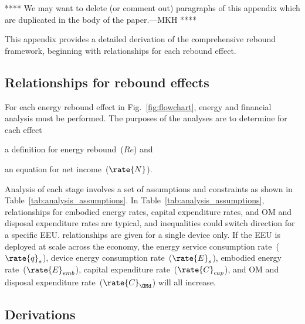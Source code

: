 

**** 
We may want to delete (or comment out)
paragraphs of this appendix which are duplicated
in the body of the paper.---MKH
****

This appendix provides a detailed derivation of the comprehensive rebound framework,
beginning with relationships for each rebound effect.


\subsection{Relationships for rebound effects}
\label{sec:relationships_for_stages}

For each energy rebound effect in Fig.~\ref{fig:flowchart},
energy and financial analysis must be performed.
The purposes of the analyses are to determine for each effect
%
\begin{enumerate*}[label={(\alph*)}]

  \item a definition for energy rebound~($Re$) and

  \item an equation for net income~($\rate{N}$).

\end{enumerate*}

Analysis of each stage involves a set of assumptions and constraints
as shown in Table~\ref{tab:analysis_assumptions}.
In Table~\ref{tab:analysis_assumptions}, 
relationships for \lceffect{} 
embodied energy rates, 
capital expenditure rates, and 
OM and disposal expenditure rates
are typical, and
inequalities could switch direction for a specific EEU.
\Prodeffect{} relationships are given for a single device only.
If the EEU is deployed at scale across the economy, 
the energy service consumption rate~($\rate{q}_s$), 
device energy consumption rate~($\rate{E}_s$), 
embodied energy rate~($\rate{E}_{emb}$),
capital expenditure rate~($\rate{C}_{cap}$), and 
OM and disposal expenditure rate~($\rate{C}_{\OMd}$)
will all increase.




\subsection{Derivations}
\label{sec:derivations}

